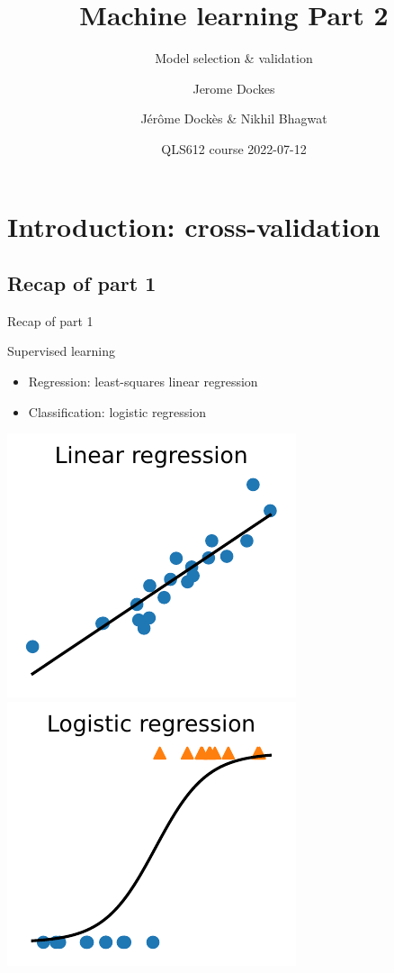 \documentclass[presentation,mathserif,table]{beamer}
\author{Jerome Dockes}
\date{}
\title{Machine learning Part 2}
\author{Jérôme Dockès \& Nikhil Bhagwat}
\date{QLS612 course 2022-07-12}
\subtitle{Model selection \& validation}
\begin{document}
\maketitle
\section{Introduction: cross-validation}
\label{sec:org806704b}
\subsection{Recap of part 1}
\label{sec:org0f2f0ea}
\begin{frame}[label={sec:org08628e2}]{Recap of part 1}
\begin{block}{Supervised learning}
\begin{itemize}
\item Regression: least-squares linear regression
\item Classification: logistic regression
\end{itemize}
\includegraphics[height=.4 \textheight]{figures/generated/linear_regression_1d/linear_regression.pdf}
\includegraphics[height=.4 \textheight]{figures/generated/logistic_regression_1d/logistic_regression.pdf}
\end{block}
\end{frame}
\end{document}
